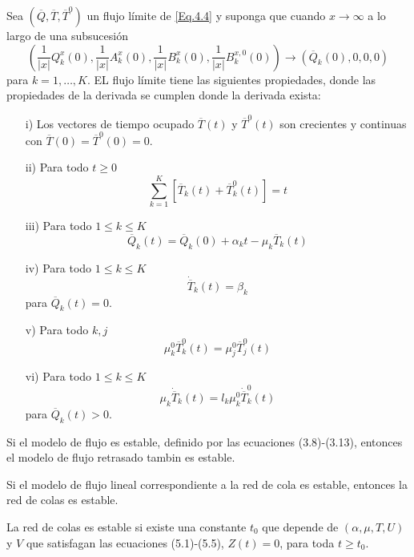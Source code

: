 \begin{Prop}
 Sea $\left(\overline{Q},\overline{T},\overline{T}^{0}\right)$ un flujo l\'imite de \ref{Eq.4.4} y suponga que cuando $x\rightarrow\infty$ a lo largo de
una subsucesi\'on
\[\left(\frac{1}{|x|}Q_{k}^{x}\left(0\right),\frac{1}{|x|}A_{k}^{x}\left(0\right),\frac{1}{|x|}B_{k}^{x}\left(0\right),\frac{1}{|x|}B_{k}^{x,0}\left(0\right)\right)\rightarrow\left(\overline{Q}_{k}\left(0\right),0,0,0\right)\]
para $k=1,\ldots,K$. EL flujo l\'imite tiene las siguientes
propiedades, donde las propiedades de la derivada se cumplen donde
la derivada exista:
\begin{itemize}
 \item[i)] Los vectores de tiempo ocupado $\overline{T}\left(t\right)$ y $\overline{T}^{0}\left(t\right)$ son crecientes y continuas con
$\overline{T}\left(0\right)=\overline{T}^{0}\left(0\right)=0$.
\item[ii)] Para todo $t\geq0$
\[\sum_{k=1}^{K}\left[\overline{T}_{k}\left(t\right)+\overline{T}_{k}^{0}\left(t\right)\right]=t\]
\item[iii)] Para todo $1\leq k\leq K$
\[\overline{Q}_{k}\left(t\right)=\overline{Q}_{k}\left(0\right)+\alpha_{k}t-\mu_{k}\overline{T}_{k}\left(t\right)\]
\item[iv)]  Para todo $1\leq k\leq K$
\[\dot{{\overline{T}}}_{k}\left(t\right)=\beta_{k}\] para $\overline{Q}_{k}\left(t\right)=0$.
\item[v)] Para todo $k,j$
\[\mu_{k}^{0}\overline{T}_{k}^{0}\left(t\right)=\mu_{j}^{0}\overline{T}_{j}^{0}\left(t\right)\]
\item[vi)]  Para todo $1\leq k\leq K$
\[\mu_{k}\dot{{\overline{T}}}_{k}\left(t\right)=l_{k}\mu_{k}^{0}\dot{{\overline{T}}}_{k}^{0}\left(t\right)\] para $\overline{Q}_{k}\left(t\right)>0$.
\end{itemize}
\end{Prop}

\begin{Lema}\label{Lema3.1}
Si el modelo de flujo es estable, definido por las ecuaciones
(3.8)-(3.13), entonces el modelo de flujo retrasado tambin es
estable.
\end{Lema}

\begin{Teo}\label{Tma.5.2}
Si el modelo de flujo lineal correspondiente a la red de cola es
estable, entonces la red de colas es estable.
\end{Teo}

\begin{Teo}\label{Tma.5.1.Chen}
La red de colas es estable si existe una constante $t_{0}$ que
depende de $\left(\alpha,\mu,T,U\right)$ y $V$ que satisfagan las
ecuaciones (5.1)-(5.5), $Z\left(t\right)=0$, para toda $t\geq
t_{0}$.
\end{Teo}



